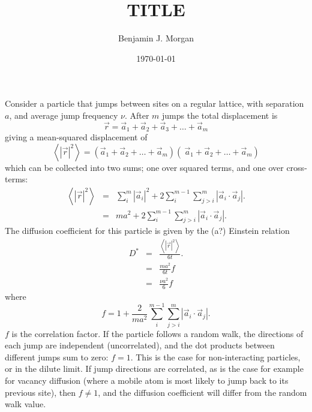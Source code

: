 \documentclass[aps,prl,twocolumn,superscriptaddress,reprint]{revtex4-1}
\begin{document}
\title{TITLE}
\author{Benjamin J. Morgan}

\date{\today}



\maketitle

Consider a particle that jumps between sites on a regular lattice, with separation $a$, and average jump frequency $\nu$. After $m$ jumps the total displacement is
\begin{equation}
  \vec{r} = \vec{a}_1 + \vec{a}_2 + \vec{a}_3 + \ldots + \vec{a}_m
\end{equation}
giving a mean-squared displacement of
\begin{equation}
  \left<\left|\vec{r}\right|^2\right> = \left( \vec{a}_1 + \vec{a}_2 + \ldots + \vec{a}_m \right)\left(\ \vec{a}_1 + \vec{a}_2 + \ldots + \vec{a}_m \right)
\end{equation}
which can be collected into two sums; one over squared terms, and one over cross-terms:
\begin{eqnarray}
  \left<\left|\vec{r}\right|^2\right> & = & \sum_i^m \left|\vec{a}_i\right|^2 + 2\sum_i^{m-1}\sum_{j>i}^m\left|\vec{a}_i\cdot\vec{a}_j\right|. \\
  & = & ma^2 + 2\sum_i^{m-1}\sum_{j>i}^m\left|\vec{a}_i\cdot\vec{a}_j\right|.
\end{eqnarray}
The diffusion coefficient for this particle is given by the (a?) Einstein relation
\begin{eqnarray}
  D^* & = & \frac{\left<\left|\vec{r}\right|^2\right>}{6t}.\\
      & = & \frac{ma^2}{6t}f\\
      & = & \frac{\nu a^2}{6}f
\end{eqnarray}
where
\begin{equation}
  f = 1 + \frac{2}{ma^2}\sum_i^{m-1}\sum_{j>i}^m\left|\vec{a}_i\cdot\vec{a}_j\right|.
\end{equation}
$f$ is the correlation factor.
 
If the particle follows a random walk, the directions of each jump are independent (uncorrelated), and the dot products between different jumps sum to zero: $f=1$. This is the case for non-interacting particles, or in the dilute limit. If jump directions are correlated, as is the case for example for vacancy diffusion (where a mobile atom is most likely to jump back to its previous site), then $f\ne1$, and the diffusion coefficient will differ from the random walk value.
\end{document}

